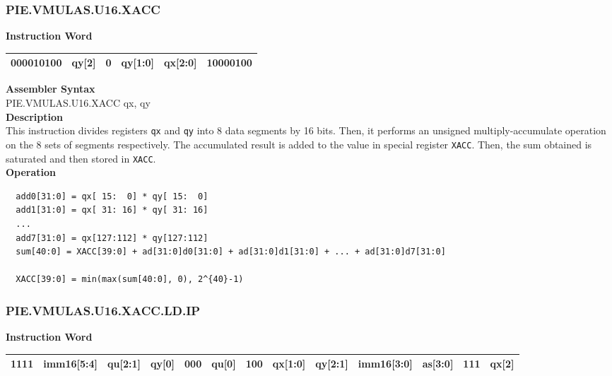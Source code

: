 \newpage
\subsubsection{PIE.VMULAS.U16.XACC}\label{instruction:PIEVMULASU16XACC}
\setlength\tabcolsep{6pt}
\textbf{Instruction Word} \\
\begin{tabular}{|c|c|c|c|c|c|}
	\hline
	000010100 & qy[2] & 0 & qy[1:0] & qx[2:0] & 10000100 \\
	\hline
\end{tabular}

\textbf{Assembler Syntax} \\
PIE.VMULAS.U16.XACC qx, qy \\
\textbf{Description} \\
This instruction divides registers \lstinline{qx} and \lstinline{qy} into 8 data segments by 16 bits. Then, it performs an unsigned multiply-accumulate operation on the 8 sets of segments respectively. The accumulated result is added to the value in special register \lstinline{XACC}. Then, the sum obtained is saturated and then stored in \lstinline{XACC}.\\
\textbf{Operation}
\begin{lstlisting}
  add0[31:0] = qx[ 15:  0] * qy[ 15:  0]
  add1[31:0] = qx[ 31: 16] * qy[ 31: 16]
  ...
  add7[31:0] = qx[127:112] * qy[127:112]
  sum[40:0] = XACC[39:0] + ad[31:0]d0[31:0] + ad[31:0]d1[31:0] + ... + ad[31:0]d7[31:0]

  XACC[39:0] = min(max(sum[40:0], 0), 2^{40}-1)
\end{lstlisting}

\newpage
\subsubsection{PIE.VMULAS.U16.XACC.LD.IP}\label{instruction:PIEVMULASU16XACCLDIP}
\setlength\tabcolsep{6pt}
\textbf{Instruction Word} \\
\begin{tabular}{|c|c|c|c|c|c|c|c|c|c|c|c|c|}
	\hline
	1111 & imm16[5:4] & qu[2:1] & qy[0] & 000 & qu[0] & 100 & qx[1:0] & qy[2:1] & imm16[3:0] & as[3:0] & 111 & qx[2] \\
	\hline
\end{tabular}

